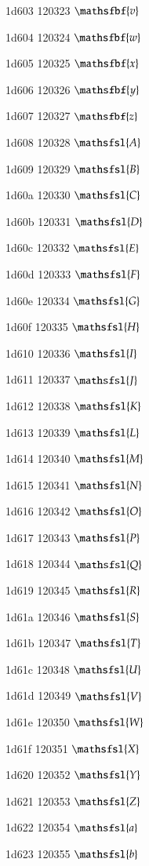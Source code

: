 \documentclass[11pt]{article}
\begin{document}
1d603 120323 \ensuremath{\mathsfbf{v}}

1d604 120324 \ensuremath{\mathsfbf{w}}

1d605 120325 \ensuremath{\mathsfbf{x}}

1d606 120326 \ensuremath{\mathsfbf{y}}

1d607 120327 \ensuremath{\mathsfbf{z}}

1d608 120328 \ensuremath{\mathsfsl{A}}

1d609 120329 \ensuremath{\mathsfsl{B}}

1d60a 120330 \ensuremath{\mathsfsl{C}}

1d60b 120331 \ensuremath{\mathsfsl{D}}

1d60c 120332 \ensuremath{\mathsfsl{E}}

1d60d 120333 \ensuremath{\mathsfsl{F}}

1d60e 120334 \ensuremath{\mathsfsl{G}}

1d60f 120335 \ensuremath{\mathsfsl{H}}

1d610 120336 \ensuremath{\mathsfsl{I}}

1d611 120337 \ensuremath{\mathsfsl{J}}

1d612 120338 \ensuremath{\mathsfsl{K}}

1d613 120339 \ensuremath{\mathsfsl{L}}

1d614 120340 \ensuremath{\mathsfsl{M}}

1d615 120341 \ensuremath{\mathsfsl{N}}

1d616 120342 \ensuremath{\mathsfsl{O}}

1d617 120343 \ensuremath{\mathsfsl{P}}

1d618 120344 \ensuremath{\mathsfsl{Q}}

1d619 120345 \ensuremath{\mathsfsl{R}}

1d61a 120346 \ensuremath{\mathsfsl{S}}

1d61b 120347 \ensuremath{\mathsfsl{T}}

1d61c 120348 \ensuremath{\mathsfsl{U}}

1d61d 120349 \ensuremath{\mathsfsl{V}}

1d61e 120350 \ensuremath{\mathsfsl{W}}

1d61f 120351 \ensuremath{\mathsfsl{X}}

1d620 120352 \ensuremath{\mathsfsl{Y}}

1d621 120353 \ensuremath{\mathsfsl{Z}}

1d622 120354 \ensuremath{\mathsfsl{a}}

1d623 120355 \ensuremath{\mathsfsl{b}}
\end{document}
